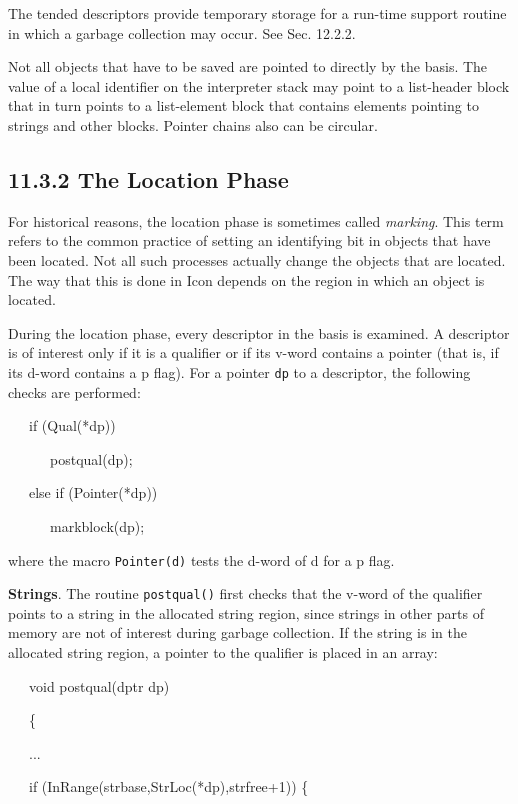 The tended descriptors provide temporary storage for a run-time
support routine in which a garbage collection may occur. See Sec. 12.2.2.

Not all objects that have to be saved are pointed to directly by the
basis. The value of a local identifier on the interpreter stack may
point to a list-header block that in turn points to a list-element
block that contains elements pointing to strings and other
blocks. Pointer chains also can be circular.

\subsection[11.3.2 The Location Phase]{11.3.2 The Location Phase}

For historical reasons, the location phase is sometimes called
\textit{marking}. This term refers to the common practice of setting
an identifying bit in objects that have been located. Not all such
processes actually change the objects that are located. The way that
this is done in Icon depends on the region in which an object is
located.

During the location phase, every descriptor in the basis is
examined. A descriptor is of interest only if it is a qualifier or if
its v-word contains a pointer (that is, if its d-word contains a p
flag). For a pointer \texttt{dp} to a descriptor, the following checks
are performed:

{\ttfamily\mdseries
\ \ \ if (Qual(*dp))}

{\ttfamily\mdseries
\ \ \ \ \ \ postqual(dp);}

{\ttfamily
\ \ \ else if (Pointer(*dp))}

{\ttfamily\mdseries
\ \ \ \ \ \ markblock(dp);}

\noindent
where the macro \texttt{Pointer(d)} tests the d-word of d for a p flag.

\textbf{Strings}. The routine \texttt{postqual()} first checks that
the v-word of the qualifier points to a string in the allocated string
region, since strings in other parts of memory are not of interest
during garbage collection. If the string is in the allocated string
region, a pointer to the qualifier is placed in an array:

{\ttfamily\mdseries
\ \ \ void postqual(dptr dp)}

{\ttfamily\mdseries
\ \ \ \{}

{\ttfamily\mdseries
\ \ \ ...}

{\ttfamily\mdseries
\ \ \ if (InRange(strbase,StrLoc(*dp),strfree+1)) \{}

